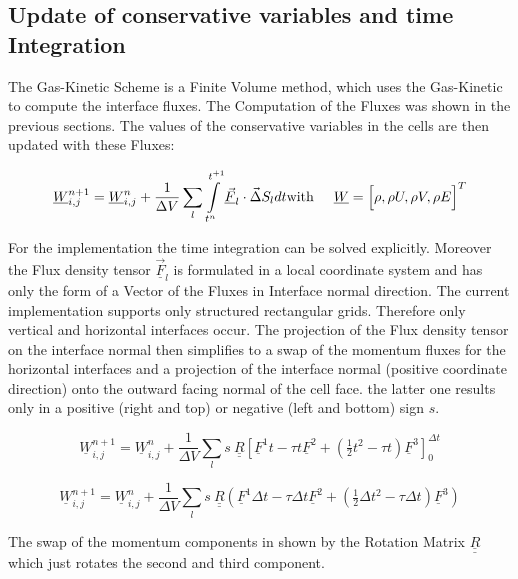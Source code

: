 \documentclass[
	pdftex,             %
	12pt,				%
	a4paper,		   	%
	english,				%
	oneside,			%
]{article}
\newcommand{\uu}[1]{\underline{#1}}
\newcommand{\uuu}[1]{\underline{\underline{#1}}}
\newcommand{\vv}[1]{\vec{#1}}
\begin{document}
\clearpage

\subsection*{Update of conservative variables and time Integration}

The Gas-Kinetic Scheme is a Finite Volume method, which uses the Gas-Kinetic to compute the interface fluxes. The Computation of the Fluxes was shown in the previous sections. The values of the conservative variables in the cells are then updated with these Fluxes:

\begin{equation}
\uu{W}_{i,j}^{n+1}
=
\uu{W}_{i,j}^{n}
+ \dfrac{1}{\Delta V}
\sum \limits_l
\int \limits_{t^n}^{t^{+1}}
\uu{\vv{F}}_l \cdot \vv{\Delta}S_l
dt
\hfill\textnormal{with}\hspace{0.5cm}
\uu{W} = \Big[ \rho, \rho U, \rho V, \rho E \Big]^T
\end{equation}

For the implementation the time integration can be solved explicitly. Moreover the Flux density tensor $\uu{\vv{F}}_l$ is formulated in a local coordinate system and has only the form of a Vector of the Fluxes in Interface normal direction. The current implementation supports only structured rectangular grids. Therefore only vertical and horizontal interfaces occur. The projection of the Flux density tensor on the interface normal then simplifies to a swap of the momentum fluxes for the horizontal interfaces and a projection of the interface normal (positive coordinate direction) onto the outward facing normal of the cell face. the latter one results only in a positive (right and top) or negative (left and bottom) sign $s$.

\begin{equation}
\uu{W}_{i,j}^{n+1}
=
\uu{W}_{i,j}^{n}
+ \dfrac{1}{\Delta V}
\sum \limits_l
s ~
\uuu{R}
\left[
\uu{F}^1 t - \tau t \uu{F}^2 + (\tfrac{1}{2} t^2 - \tau t) \uu{F}^3
\right]_0^{\Delta t}
\end{equation}


\begin{equation}
\uu{W}_{i,j}^{n+1}
=
\uu{W}_{i,j}^{n}
+ \dfrac{1}{\Delta V}
\sum \limits_l
s ~
\uuu{R}
\left(
\uu{F}^1 \Delta t - \tau \Delta t \uu{F}^2 + (\tfrac{1}{2} \Delta t^2 - \tau \Delta t) \uu{F}^3
\right)
\end{equation}

The swap of the momentum components in shown by the Rotation Matrix $\uuu{R}$ which just rotates the second and third component.
\end{document}
